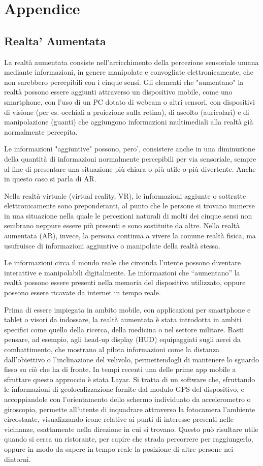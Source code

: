 \section{Appendice}
\subsection{Realta' Aumentata}
La realtà aumentata consiste nell'arricchimento della percezione sensoriale umana mediante informazioni, in genere manipolate e convogliate elettronicamente, che non sarebbero percepibili con i cinque sensi.
Gli elementi che "aumentano" la realtà possono essere aggiunti attraverso un dispositivo mobile, come uno smartphone, con l'uso di un PC dotato di webcam o altri sensori, con dispositivi di visione (per es. occhiali a proiezione sulla retina), di ascolto (auricolari) e di manipolazione (guanti) che aggiungono informazioni multimediali alla realtà già normalmente percepita.

Le informazioni "aggiuntive" possono, pero', consistere anche in una diminuzione della quantità di informazioni normalmente percepibili per via sensoriale, sempre al fine di presentare una situazione più chiara o più utile o più divertente. Anche in questo caso si parla di AR.

Nella realtà virtuale (virtual reality, VR), le informazioni aggiunte o sottratte elettronicamente sono preponderanti, al punto che le persone si trovano immerse in una situazione nella quale le percezioni naturali di molti dei cinque sensi non sembrano neppure essere più presenti e sono sostituite da altre. Nella realtà aumentata (AR), invece, la persona continua a vivere la comune realtà fisica, ma usufruisce di informazioni aggiuntive o manipolate della realtà stessa.

Le informazioni circa il mondo reale che circonda l'utente possono diventare interattive e manipolabili digitalmente.
Le informazioni che “aumentano” la realtà possono essere presenti nella memoria del dispositivo utilizzato, oppure possono essere ricavate da internet in tempo reale.

Prima di essere impiegata in ambito mobile, con applicazioni per smartphone e tablet o visori da indossare, la realtà aumentata è stata introdotta in ambiti specifici come quello della ricerca, della medicina o nel settore militare. Basti pensare, ad esempio, agli head-up display (HUD) equipaggiati sugli aerei da combattimento, che mostrano al pilota informazioni come la distanza dall’obiettivo o l’inclinazione del velivolo, permettendogli di mantenere lo sguardo fisso su ciò che ha di fronte.
In tempi recenti una delle prime app mobile a sfruttare questo approccio è stata Layar. Si tratta di un software che, sfruttando le informazioni di geolocalizzazione fornite dal modulo GPS del dispositivo, e accoppiandole con l’orientamento dello schermo individuato da accelerometro o giroscopio, permette all’utente di inquadrare attraverso la fotocamera l’ambiente circostante, visualizzando icone relative ai punti di interesse presenti nelle vicinanze, esattamente nella direzione in cui si trovano. Questo può risultare utile quando si cerca un ristorante, per capire che strada percorrere per raggiungerlo, oppure in modo da sapere in tempo reale la posizione di altre persone nei dintorni.

